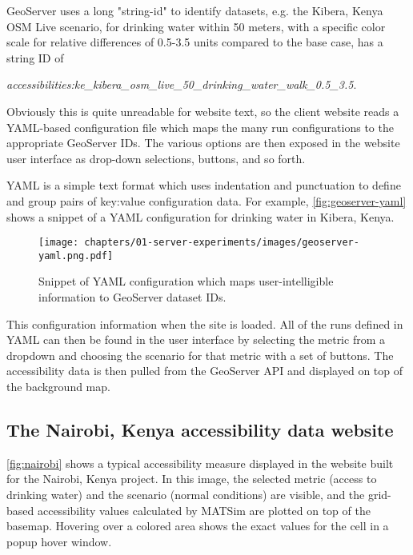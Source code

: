GeoServer uses a long "string-id" to identify datasets, e.g. the Kibera, Kenya OSM Live scenario, for drinking water within 50 meters, with a specific color scale for relative differences of 0.5-3.5 units compared to the base case, has a string ID of

\emph{accessibilities:ke\_kibera\_osm\_live\_50\_drinking\_water\_walk\_0.5\_3.5}.

Obviously this is quite unreadable for website text, so the client website reads a YAML-based configuration file which maps the many run configurations to the appropriate GeoServer IDs. The various options are then exposed in the website user interface as drop-down selections, buttons, and so forth.

YAML is a simple text format which uses indentation and punctuation to define and group pairs of key:value configuration data. For example, \autoref{fig:geoserver-yaml} shows a snippet of a YAML configuration for drinking water in Kibera, Kenya.

\begin{figure}[!ht]
  \texttt{[image: chapters/01-server-experiments/images/geoserver-yaml.png.pdf]}
  \caption{Snippet of YAML configuration which maps user-intelligible information to GeoServer dataset IDs.}
  \label{fig:geoserver-yaml}
\end{figure}

This configuration information when the site is loaded. All of the runs defined in YAML can then be found in the user interface by selecting the metric from a dropdown and choosing the scenario for that metric with a set of buttons. The accessibility data is then pulled from the GeoServer API and displayed on top of the background map.

\hypertarget{server-experiments-geoserver-3}{%
\subsection{The Nairobi, Kenya accessibility data website}
\label{server-experiments-geoserver-3}}

\autoref{fig:nairobi} shows a typical accessibility measure displayed in the website built for the Nairobi, Kenya project. In this image, the selected metric (access to drinking water) and the scenario (normal conditions) are visible, and the grid-based accessibility values calculated by MATSim are plotted on top of the basemap. Hovering over a colored area shows the exact values for the cell in a popup hover window.

